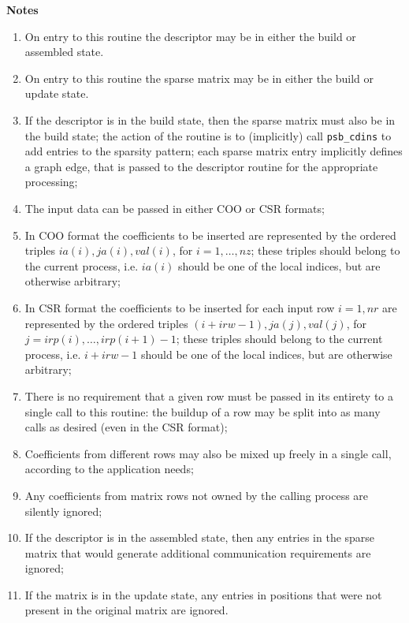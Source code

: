 {\par\noindent\large\bfseries Notes}
\begin{enumerate}
\item On entry to this routine the descriptor may be in either the
  build or assembled state.
\item On entry to this routine the sparse matrix may be in either the
  build or update state. 
\item If the descriptor is in the build state, then the sparse matrix
  must also be in the build state; the action of the routine is to
  (implicitly) call \verb|psb_cdins| to add entries to the sparsity
  pattern; each sparse matrix entry implicitly defines a graph edge,
  that is passed to the descriptor routine for the appropriate
  processing;
\item The input data can be passed in either COO or CSR formats;
\item In COO format the coefficients to be inserted are represented by
  the ordered   triples $ia(i),ja(i),val(i)$, for $i=1,\dots,nz$;
  these triples  should belong to the current process, i.e. $ia(i)$
  should be one of  the local indices, but are otherwise arbitrary;
\item In CSR format the coefficients to be inserted for each input row $i=1,nr$
  are represented by the ordered triples $(i+irw-1),ja(j),val(j)$, for
  $j=irp(i),\dots,irp(i+1)-1$; 
  these triples  should belong to the current process, i.e. $i+irw-1$
  should be one of  the local indices, but are otherwise arbitrary;  
\item There is no   requirement that a given row must be passed in its
  entirety to a   single call to this routine: the buildup of a row
  may be split into   as many calls as desired (even in the CSR format); 
\item Coefficients from different rows may also be mixed up freely
  in a single call, according to the application needs; 
\item Any coefficients from matrix rows not owned by the calling
  process are silently ignored;
\item If the descriptor is in the assembled state, then any entries in
  the sparse matrix that would generate additional communication
  requirements are  ignored; 
\item If the matrix is in the update state, any entries in positions
  that were not present in the original matrix are ignored. 
\end{enumerate}

